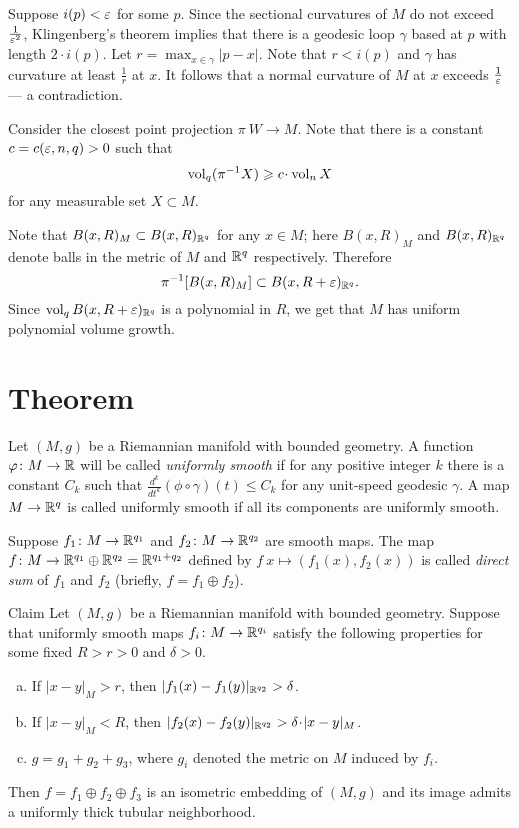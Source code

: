 \documentclass[a4paper,10pt]{article}
\begin{document}
Suppose $i(p)<\varepsilon$ for some $p$.
Since the sectional curvatures of $M$ do not exceed $\tfrac1{\varepsilon^2}$,
Klingenberg's theorem implies that there is a geodesic loop $\gamma$ based at $p$ with length $2\cdot i(p)$.
Let $r=\max_{x\in\gamma}|p-x|$.
Note that $r<i(p)$ and $\gamma$ has curvature at least $\tfrac1r$ at $x$.
It follows that a normal curvature of $M$ at $x$ exceeds $\tfrac1{\varepsilon}$ --- a contradiction.

Consider the closest point projection $\pi\:W\to M$.
Note that there is a constant $c=c(\varepsilon,n,q)>0$ such that
\[\vol_q (\pi^{-1}X)\ge c\cdot\vol_n X\]
for any measurable set $X\subset M$.

Note that $B(x,R)_M\subset B(x,R)_{\mathbb{R}^q}$ for any $x\in M$;
here $B(x,R)_M$ and $B(x,R)_{\mathbb{R}^q}$ denote balls in the metric of $M$ and $\mathbb{R}^q$ respectively.
Therefore 
\[\pi^{-1}[B(x,R)_M]\subset B(x,R+\varepsilon)_{\mathbb{R}^q}.\]
Since $\operatorname{\rm vol}_q B(x,R+\varepsilon)_{\mathbb{R}^q}$ is a polynomial in $R$, we get that $M$ has uniform polynomial volume growth.
\qeds

\section{Theorem}

Let $(M,g)$ be a Riemannian manifold with bounded geometry.
A function $\varphi\colon M\to \mathbb{R}$ will be called \emph{uniformly smooth} if for any positive integer $k$ there is a constant $C_k$ such that $\tfrac{d^k}{dt^k}(\phi\circ\gamma)(t)\le C_k$ for any unit-speed geodesic $\gamma$.
A map $M\to \mathbb{R}^{q}$ is called uniformly smooth if all its components are uniformly smooth. 

Suppose $f_1\colon M\to \mathbb{R}^{q_1}$ and $f_2\colon M\to \mathbb{R}^{q_2}$ are smooth maps.
The map $f\colon M\to \mathbb{R}^{q_1}\oplus\mathbb{R}^{q_2}=\mathbb{R}^{q_1+q_2}$ defined by $f\:x\mapsto (f_1(x),f_2(x))$ is called \emph{direct sum} of $f_1$ and $f_2$ (briefly, $f=f_1\oplus f_2$).


\begin{thm}{Claim}
Let $(M,g)$ be a Riemannian manifold with bounded geometry.
Suppose that uniformly smooth maps $f_i\colon M\to \mathbb{R}^{q_i}$ satisfy the following properties
for some fixed $R>r>0$ and $\delta>0$.
\begin{enumerate}[(a)]
\item\label{clm:r} If $|x-y|_M>r$, then $|f_1(x)-f_1(y)|_{\mathbb{R}^{q_2}}>\delta$.
\item\label{clm:R} If $|x-y|_M<R$, then $|f_2(x)-f_2(y)|_{\RR^{q_2}}>\delta\cdot |x-y|_M$.
\item\label{clm:g} $g=g_1+g_2+g_3$, where $g_i$ denoted the metric on $M$ induced by $f_i$.
\end{enumerate}
Then $f=f_1\oplus f_2\oplus f_3$ is an isometric embedding of $(M,g)$ and its image admits a uniformly thick tubular neighborhood. 
\end{thm}
\end{document}
